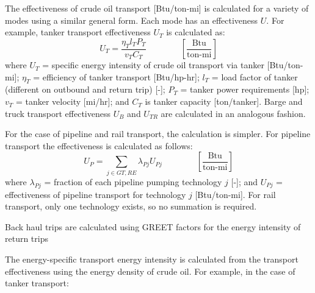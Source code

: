\documentclass[11pt]{report}
\newcommand{\eqnunitfrac}[2]{\quad\quad \scriptstyle{\left[\frac{\text{#1}}{\text{#2}}\right]}}
\begin{document}
The effectiveness of crude oil transport [Btu/ton-mi] is calculated for a variety of modes using a similar general form. Each mode has an effectiveness $U$. For example, tanker transport effectiveness $U_{T}$ is calculated as:
\begin{equation}\label{eq:trans_ek}
U_T = \frac{\eta_T l_T P_T}{v_T C_T} \quad\quad\eqnunitfrac{Btu}{ton-mi}
\end{equation}
where $U_T$ = specific energy intensity of crude oil transport via tanker [Btu/ton-mi]; $\eta_T$ = efficiency of tanker transport [Btu/hp-hr]; $l_T$ = load factor of tanker (different on outbound and return trip) [-]; $P_T$ = tanker power requirements [hp]; $v_T$ = tanker velocity [mi/hr]; and $C_T$ is tanker capacity [ton/tanker]. Barge and truck transport effectiveness $U_{B}$ and $U_{TR}$ are calculated in an analogous fashion.

For the case of pipeline and rail transport, the calculation is simpler. For pipeline transport the effectiveness is calculated as follows: 
\begin{equation}\label{eq:trans_ep}
U_P = \sum_{j \in GT, RE} \lambda_{Pj} U_{Pj} \quad\quad\eqnunitfrac{Btu}{ton-mi}
\end{equation}
where $\lambda_{Pj}$ = fraction of each pipeline pumping technology $j$ [-]; and $U_{Pj}$ = effectiveness of pipeline transport for technology $j$ [Btu/ton-mi]. For rail transport, only one technology exists, so no summation is required.

Back haul trips are calculated using GREET factors for the energy intensity of return trips \cite{Wang2010}

The energy-specific transport energy intensity is calculated from the transport effectiveness using the energy density of crude oil. For example, in the case of tanker transport:
\end{document}
